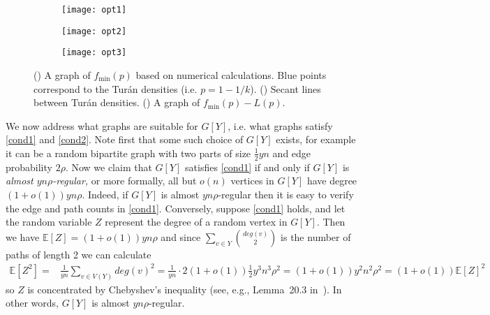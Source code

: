\documentclass[12pt]{article}
\newcommand{\E}{\mathbb{E}}
\theoremstyle{definition}
\theoremstyle{remark}
\begin{document}
\begin{figure}
\centering
\begin{subfigure}[b]{0.3\textwidth}
                \centering
                \texttt{[image: opt1]}
                \caption{}
                \label{subfig:1}
\end{subfigure}
\quad
\begin{subfigure}[b]{0.3\textwidth}
                \centering
                \texttt{[image: opt2]}
                \caption{}
                \label{subfig:2}
\end{subfigure}%
\quad
\begin{subfigure}[b]{0.3\textwidth}
                \centering
                \texttt{[image: opt3]}
                \caption{}
                \label{subfig:3}
\end{subfigure}%
\caption{() A graph of $f_{\min}(p)$ based on numerical calculations. Blue points correspond to the Tur\'an densities (i.e. $p=1-1/k$). () Secant lines between Tur\'an densities. () A graph of $f_{\min}(p) - L(p)$.}
\label{fig:opt}
\end{figure}


We now address what graphs are suitable for $G[Y]$, i.e. what graphs satisfy \eqref{cond1} and \eqref{cond2}. Note first that some such choice of $G[Y]$ exists, for example it can be a random bipartite graph with two parts of size $\frac12 yn$ and edge probability $2 \rho$. Now we claim that $G[Y]$ satisfies \eqref{cond1} if and only if $G[Y]$ is {\it almost $yn\rho$-regular,} or more formally, all but $o(n)$ vertices in $G[Y]$ have degree $(1+o(1))yn\rho$. Indeed, if $G[Y]$ is almost $yn\rho$-regular then it is easy to verify the edge and path counts in \eqref{cond1}. Conversely, suppose \eqref{cond1} holds, and let the random variable $Z$ represent the degree of a random vertex in $G[Y]$. Then we have $\E[Z] = (1+o(1))yn\rho$ and since $\sum_{v \in Y} \binom{deg(v)}{2}$ is the number of paths of length 2 we can calculate
\begin{align*}
\E[Z^2] = & \frac1{yn} \sum_{v \in V(Y)} deg(v)^2= \frac1{yn}\cdot 2(1+o(1))\frac12 y^3n^3 \rho^2= (1+o(1))y^2 n^2 \rho^2 = (1+o(1))\E[Z]^2
\end{align*}
so $Z$ is concentrated by Chebyshev's inequality (see, e.g., Lemma~20.3 in~\cite{FriKar2016}). In other words, $G[Y]$ is almost $yn \rho$-regular. 
\end{document}
